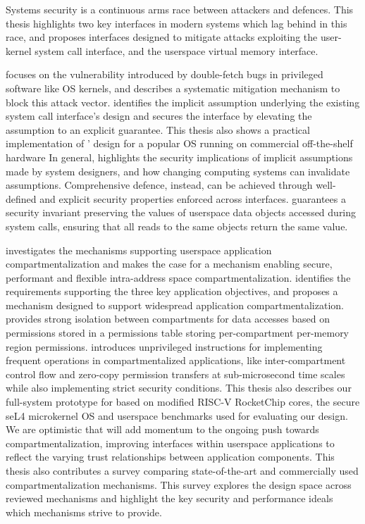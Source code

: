 Systems security is a continuous arms race between attackers and defences.
This thesis highlights two key interfaces in modern systems which lag
behind in this race, and proposes interfaces designed to mitigate attacks
exploiting the user-kernel system call interface, and the
userspace virtual memory interface.

\midas focuses on the vulnerability introduced by double-fetch bugs in
privileged software like OS kernels, and describes a systematic mitigation
mechanism to block this attack vector.
\midas identifies the implicit assumption underlying the existing system call 
interface's design and secures the interface by elevating the assumption to
an explicit guarantee.
This thesis also shows a practical implementation of \midas' design for
a popular OS running on commercial off-the-shelf hardware
In general, \midas highlights the security implications of implicit assumptions
made by system designers, and 
how changing computing systems can invalidate assumptions.
Comprehensive defence, instead, can be achieved through well-defined and
explicit security properties enforced across interfaces.
\midas guarantees a security invariant preserving the values of userspace data
objects accessed during system calls, ensuring that all reads to the same
objects return the same value.

\seccells investigates the mechanisms supporting userspace application
compartmentalization and makes the case for a mechanism enabling 
secure, performant and flexible intra-address space compartmentalization.
\seccells identifies the requirements supporting the three key application
objectives, and proposes a mechanism designed to support widespread
application compartmentalization.
\seccells provides strong isolation between compartments for data accesses
based on permissions stored in a permissions table storing
per-compartment per-memory region permissions.
\seccells introduces unprivileged instructions for implementing frequent 
operations in compartmentalized applications, like inter-compartment
control flow and zero-copy permission transfers at sub-microsecond time
scales while also implementing strict security conditions.
This thesis also describes our full-system prototype for \seccells based
on modified RISC-V RocketChip cores, the secure seL4 microkernel OS and
userspace benchmarks used for evaluating our design.
We are optimistic that \seccells will add momentum to the ongoing push
towards compartmentalization, improving interfaces within userspace applications
to reflect the varying trust relationships between application components.
This thesis also contributes a survey comparing state-of-the-art and
commercially used compartmentalization mechanisms.
This survey explores the design space across reviewed mechanisms and 
highlight the key security and performance ideals which mechanisms strive to
provide.

